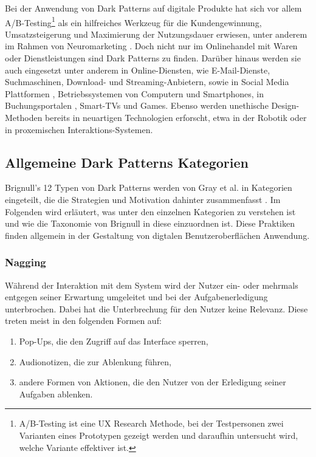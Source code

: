 \documentclass[a4paper]{article}
\begin{document}
Bei der Anwendung von Dark Patterns auf digitale Produkte hat sich vor allem A/B-Testing\footnote{\label{foot:1}A/B-Testing ist eine UX Research Methode, bei der Testpersonen zwei Varianten eines Prototypen gezeigt werden und daraufhin untersucht wird, welche Variante effektiver ist.} als ein hilfreiches Werkzeug für die Kundengewinnung, Umsatzsteigerung und Maximierung der Nutzungsdauer erwiesen, unter anderem im Rahmen von Neuromarketing \cite{snv}\cite{narayanan}\cite{tab}. Doch nicht nur im Onlinehandel mit Waren oder Dienstleistungen sind Dark Patterns zu finden. Darüber hinaus werden sie auch eingesetzt unter anderem in Online-Diensten, wie E-Mail-Dienste, Suchmaschinen, Download- und Streaming-Anbietern, sowie in Social Media Plattformen \cite{fastcompany}, Betriebssystemen von Computern und Smartphones, in Buchungsportalen \cite{swr}, Smart-TVs \cite{bundeskartellamt} und Games. Ebenso werden unethische Design-Methoden bereits in neuartigen Technologien erforscht, etwa in der Robotik oder in proxemischen Interaktions-Systemen.  

\subsection{Allgemeine Dark Patterns Kategorien}
\label{sub:dark_patterns_kategorien}
Brignull's 12 Typen von Dark Patterns werden von Gray et al. in Kategorien eingeteilt, die die Strategien und Motivation dahinter zusammenfasst \cite{gray}. 
Im Folgenden wird erläutert, was unter den einzelnen Kategorien zu verstehen ist und wie die Taxonomie von Brignull in diese einzuordnen ist. Diese Praktiken finden allgemein in der Gestaltung von digtalen Benutzeroberflächen Anwendung.

\subsubsection{Nagging}
Während der Interaktion mit dem System wird der Nutzer ein- oder mehrmals entgegen seiner Erwartung umgeleitet und bei der Aufgabenerledigung unterbrochen. Dabei hat die Unterbrechung für den Nutzer keine Relevanz. Diese treten meist in den folgenden Formen auf:
\begin{enumerate}[label=\arabic*)]
	\item{Pop-Ups, die den Zugriff auf das Interface sperren,}
	\item{Audionotizen, die zur Ablenkung führen,}
	\item{andere Formen von Aktionen, die den Nutzer von der Erledigung seiner Aufgaben ablenken.}
\end{enumerate}
\end{document}
